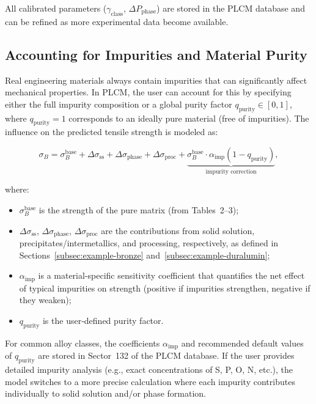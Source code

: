 \documentclass[12pt,a4paper]{article}
\begin{document}
	All calibrated parameters (\(\gamma_{\text{class}}\), \(\Delta P_{\text{phase}}\)) are stored in the PLCM database and can be refined as more experimental data become available.
	
	
	\subsection{Accounting for Impurities and Material Purity}
	\label{subsec:purity}
	
	Real engineering materials always contain impurities that can significantly
	affect mechanical properties. In PLCM, the user can account for this by
	specifying either the full impurity composition or a global purity factor
	\(q_{\mathrm{purity}} \in [0,1]\), where \(q_{\mathrm{purity}}=1\) corresponds
	to an ideally pure material (free of impurities). The influence on the
	predicted tensile strength is modeled as:
	
	\[
	\sigma_B = \sigma_B^{\mathrm{base}} + \Delta\sigma_{\mathrm{ss}} +
	\Delta\sigma_{\mathrm{phase}} + \Delta\sigma_{\mathrm{proc}} +
	\underbrace{\sigma_B^{\mathrm{base}} \cdot \alpha_{\mathrm{imp}} (1 - q_{\mathrm{purity}})}_{\text{impurity correction}},
	\]
	
	where:
	\begin{itemize}
		\item \(\sigma_B^{\mathrm{base}}\) is the strength of the pure matrix
		(from Tables~2--3);
		\item \(\Delta\sigma_{\mathrm{ss}}\), \(\Delta\sigma_{\mathrm{phase}}\),
		\(\Delta\sigma_{\mathrm{proc}}\) are the contributions from solid
		solution, precipitates/intermetallics, and processing, respectively,
		as defined in Sections~\ref{subsec:example-bronze}
		and~\ref{subsec:example-duralumin};
		\item \(\alpha_{\mathrm{imp}}\) is a material-specific sensitivity coefficient
		that quantifies the net effect of typical impurities on strength
		(positive if impurities strengthen, negative if they weaken);
		\item \(q_{\mathrm{purity}}\) is the user‑defined purity factor.
	\end{itemize}
	
	For common alloy classes, the coefficients \(\alpha_{\mathrm{imp}}\) and
	recommended default values of \(q_{\mathrm{purity}}\) are stored in
	Sector~132 of the PLCM database. If the user provides detailed impurity
	analysis (e.g., exact concentrations of S, P, O, N, etc.), the model
	switches to a more precise calculation where each impurity contributes
	individually to solid solution and/or phase formation.
	
\end{document}
